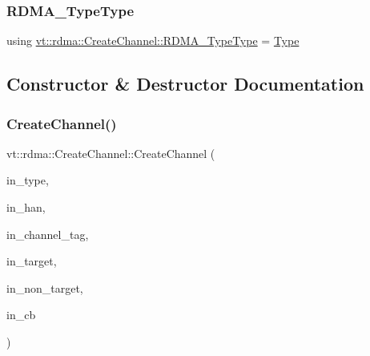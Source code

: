 \subsubsection{\texorpdfstring{R\+D\+M\+A\+\_\+\+Type\+Type}{RDMA\_TypeType}}
{\footnotesize\ttfamily using \hyperlink{namespacevt_1_1rdma_ac848e1d9da43db6294bd06f83e5d3946}{vt\+::rdma\+::\+Create\+Channel\+::\+R\+D\+M\+A\+\_\+\+Type\+Type} =  \hyperlink{namespacevt_1_1rdma_ac848e1d9da43db6294bd06f83e5d3946}{Type}}



\subsection{Constructor \& Destructor Documentation}
\mbox{\label{structvt_1_1rdma_1_1_create_channel_ad3c3265c63c536dfb68e30886438bdf8}} 
\subsubsection{\texorpdfstring{Create\+Channel()}{CreateChannel()}}
{\footnotesize\ttfamily vt\+::rdma\+::\+Create\+Channel\+::\+Create\+Channel (\begin{DoxyParamCaption}\item[{\hyperlink{namespacevt_1_1rdma_ac848e1d9da43db6294bd06f83e5d3946}{R\+D\+M\+A\+\_\+\+Type\+Type} const \&}]{in\+\_\+type,  }\item[{\hyperlink{namespacevt_a10442579ec4e7ebef223818e64bcf908}{R\+D\+M\+A\+\_\+\+Handle\+Type} const \&}]{in\+\_\+han,  }\item[{\hyperlink{namespacevt_a84ab281dae04a52a4b243d6bf62d0e52}{Tag\+Type} const \&}]{in\+\_\+channel\+\_\+tag,  }\item[{\hyperlink{namespacevt_a866da9d0efc19c0a1ce79e9e492f47e2}{Node\+Type} const \&}]{in\+\_\+target,  }\item[{\hyperlink{namespacevt_a866da9d0efc19c0a1ce79e9e492f47e2}{Node\+Type} const \&}]{in\+\_\+non\+\_\+target,  }\item[{\hyperlink{namespacevt_a57b238783d05de96bc2c4027f7073b7f}{Callback}$<$ \hyperlink{structvt_1_1rdma_1_1_get_info_channel}{Get\+Info\+Channel} $>$}]{in\+\_\+cb }\end{DoxyParamCaption})\hspace{0.3cm}{\ttfamily [inline]}}



